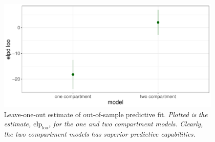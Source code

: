\begin{figure}
  \begin{center}
    \includegraphics[width = 5in]{../figures/elpd_loo_comp_4x8.pdf}
    \caption{Leave-one-out estimate of out-of-sample predictive fit. \textit{Plotted is the estimate, $\mathrm{elp}_\mathrm{loo}$, for the one and two compartment models. Clearly, the two compartment models has superior predictive capabilities.}}
    \label{fig:loo}
  \end{center}
\end{figure}


